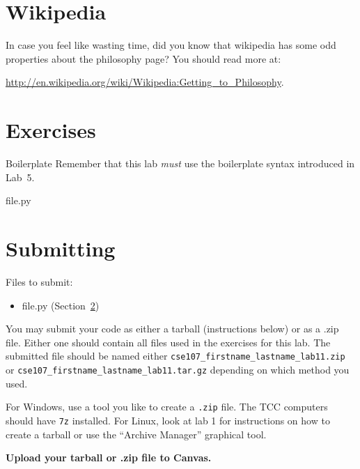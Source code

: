 \documentclass[11pt]{cselabheader}
\begin{document}
\pagebreak
\section{Wikipedia}

In case you feel like wasting time, did you know that wikipedia has some odd
properties about the philosophy page? You should read more at:

\centerline{\url{http://en.wikipedia.org/wiki/Wikipedia:Getting_to_Philosophy}.}

\pagebreak
\section{Exercises}
\label{sec:ex}


\begin{warningbox}{Boilerplate}
  Remember that this lab \emph{must} use the
  boilerplate syntax introduced in Lab~5.
\end{warningbox}

\begin{description}
  \item[file.py]
\end{description}

\pagebreak
\section{Submitting}

Files to submit:
\begin{itemize}
\item file.py (Section~\ref{sec:ex})
\end{itemize}

You may submit your code as either a tarball (instructions below) or as a .zip
file. Either one should contain all files used in the exercises for this lab.
The submitted file should be named either
\texttt{cse107\_firstname\_lastname\_lab11.zip} or
\texttt{cse107\_firstname\_lastname\_lab11.tar.gz} depending on which method you
used.

For Windows, use a tool you like to create a \texttt{.zip} file. The TCC
computers should have \texttt{7z} installed. For Linux, look at lab 1 for
instructions on how to create a tarball or use the ``Archive Manager'' graphical
tool.

\begin{center}
  \textbf{Upload your tarball or .zip file to Canvas.}
\end{center}
\end{document}
